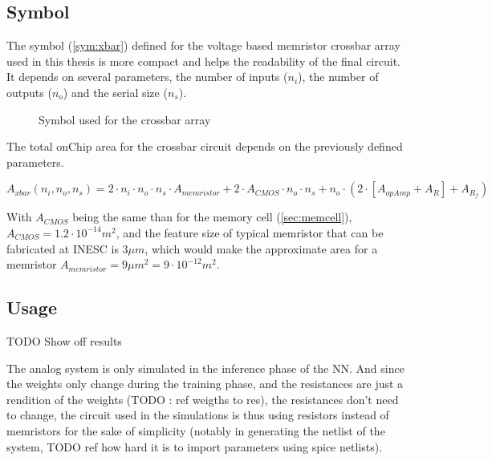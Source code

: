 \subsection{Symbol}
The symbol (\cref{sym:xbar}) defined for the voltage based memristor crossbar array used in this thesis is more compact and helps the readability of the final circuit. It depends on several parameters, the number of inputs ($n_i$), the number of outputs ($n_o$) and the serial size ($n_s$).

\begin{figure}[H]
  \centering
  
  \caption{Symbol used for the crossbar array}
  \label{symb:xbar}
\end{figure}

The total onChip area for the crossbar circuit depends on the previously defined parameters.

\begin{equation}
  A_{xbar}(n_i,n_o,n_s)=2\cdot n_i\cdot n_o \cdot n_s\cdot A_{memristor}+2\cdot A_{CMOS}\cdot n_o\cdot n_s +n_o\cdot(2\cdot[A_{opAmp}+A_R]+A_{R_f})
\end{equation}

With $A_{CMOS}$ being the same than for the memory cell (\cref{sec:memcell}), $A_{CMOS}=1.2\cdot 10^{-14}m^2$, and the feature size of typical memristor that can be fabricated at INESC is $3\mu m$, which would make the approximate area for a memristor $A_{memristor}=9\mu m^2=9\cdot 10^{-12} m^2$.%

\subsection{Usage}

TODO Show off results

The analog system is only simulated in the inference phase of the \ac{NN}. And since the weights only change during the training phase, and the resistances are just a rendition of the weights (TODO : ref weigths to res), the resistances don't need to change, the circuit used in the simulations is thus using resistors instead of memristors for the sake of simplicity (notably in generating the netlist of the system, TODO ref how hard it is to import parameters using spice netlists).
